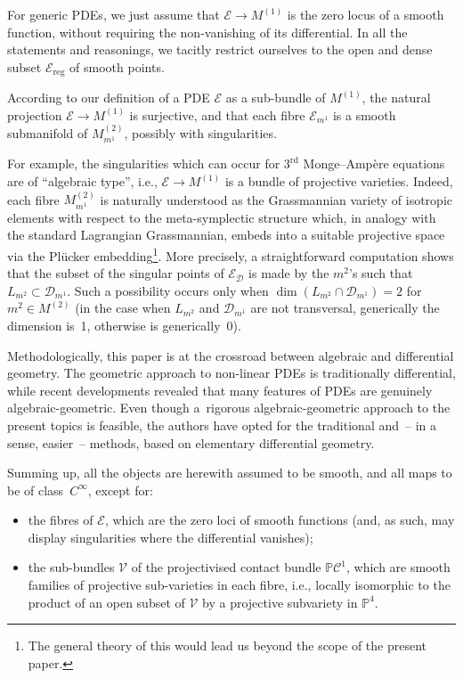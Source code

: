 \documentclass[10pt,a4paper]{amsart}
\newcommand{\C}{\mathcal{C}}
\newcommand{\D}{\mathcal{D}}
\newcommand{\M}{\mathcal{V}}
\newcommand{\E}{\mathcal{E}}
\renewcommand{\P}{\mathbb{P}}
\newcommand{\Rd}{^\textrm{rd}}
\numberwithin{equation}{section}
\begin{document}
For generic PDEs, we just assume that $\E\longrightarrow M^{(1)}$ is the zero locus of a smooth function, without requiring the non-vanishing of its dif\/ferential. In all the statements and reasonings, we tacitly restrict ourselves to the open and dense subset $\E_{\textrm{reg}}$ of smooth points.

According to our def\/inition of a PDE $\E$ as a sub-bundle of $M^{(1)}$, the natural projection $\E\longrightarrow M^{(1)}$ is surjective,
 and that each f\/ibre $\E_{m^1}$ is a smooth submanifold of $M^{(2)}_{m^1}$, possibly with singularities.

For example, the singularities which can occur for $3\Rd$ Monge--Amp\`ere equations are of ``algebraic type'', i.e., $\E\longrightarrow M^{(1)}$ is a bundle of projective varieties. Indeed, each f\/ibre $M^{(2)}_{m^1}$ is naturally understood as the Grassmannian variety of isotropic elements with respect to the meta-symplectic structure which, in analogy with the standard Lagrangian Grassmannian, embeds into a suitable projective space via the Pl\"ucker embedding\footnote{The general theory of this would lead us beyond the scope of the present paper.}. More precisely, a straightforward computation shows that the subset of the singular points of $\E_\D$ is made by the $m^2$'s such that $L_{m^2}\subset\D_{m^1}$. Such a possibility occurs only when $\dim(L_{m^2}\cap\D_{m^1})=2$ for $m^2\in M^{(2)}$ (in the case when $L_{m^2}$ and $\D_{m^1}$ are not transversal, generically the dimension is~1, otherwise is generically~0).

Methodologically, this paper is at the crossroad between algebraic and dif\/ferential geometry. The geometric approach to non-linear PDEs is traditionally dif\/ferential, while recent developments revealed that many features of PDEs are genuinely algebraic-geometric. Even though a~rigorous algebraic-geometric approach to the present topics is feasible, the authors have opted for the traditional and~-- in a sense, easier~-- methods, based on elementary dif\/ferential geometry.

Summing up, all the objects are herewith assumed to be smooth, and all maps to be of class~$C^\infty$, except for:
\begin{itemize}\itemsep=0pt
\item the f\/ibres of $\E$, which are the zero loci of smooth functions (and, as such, may display singularities where the dif\/ferential vanishes);
\item the sub-bundles $\M$ of the projectivised contact bundle $\P\C^1$, which are smooth families of projective sub-varieties in each f\/ibre, i.e., locally isomorphic to the product of an open subset of $\M$ by a projective subvariety in $\P^4$.
\end{itemize}
\end{document}
